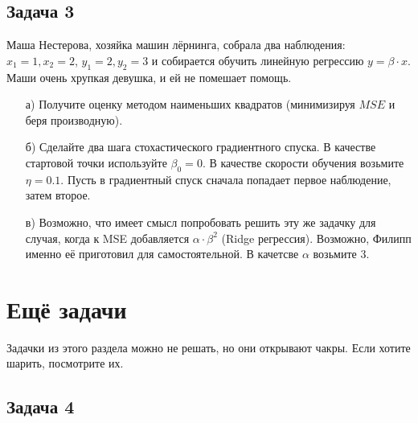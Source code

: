 \documentclass[12pt, a4paper, oneside]{article}
\begin{document}
\subsection*{Задача 3}

	Маша Нестерова, хозяйка машин лёрнинга,  собрала два наблюдения: $x_1 = 1, x_2 = 2$, $y_1 = 2, y_2 = 3$ и собирается обучить линейную регрессию $y = \beta \cdot x$.  Маши очень хрупкая девушка, и ей не помешает помощь. 

\begin{enumerate}
\item[а)] Получите оценку методом наименьших квадратов (минимизируя $MSE$ и беря производную).
	
\item[б)]   Сделайте два шага стохастического градиентного спуска. В качестве стартовой точки используйте $\beta_0 = 0$.  В качестве скорости обучения возьмите $\eta = 0.1$.  Пусть в градиентный спуск сначала попадает первое наблюдение, затем второе. 

\item[в)]   Возможно, что имеет смысл попробовать решить эту же задачку для случая, когда к MSE добавляется $\alpha \cdot \beta^2$ (Ridge регрессия). Возможно, Филипп именно её приготовил для самостоятельной.  В качетсве $\alpha$ возьмите $3$. 
\end{enumerate}




\section*{Ещё задачи}

Задачки из этого раздела можно не решать, но они открывают чакры. Если хотите шарить, посмотрите их. 

\subsection*{Задача 4}
\end{document}
